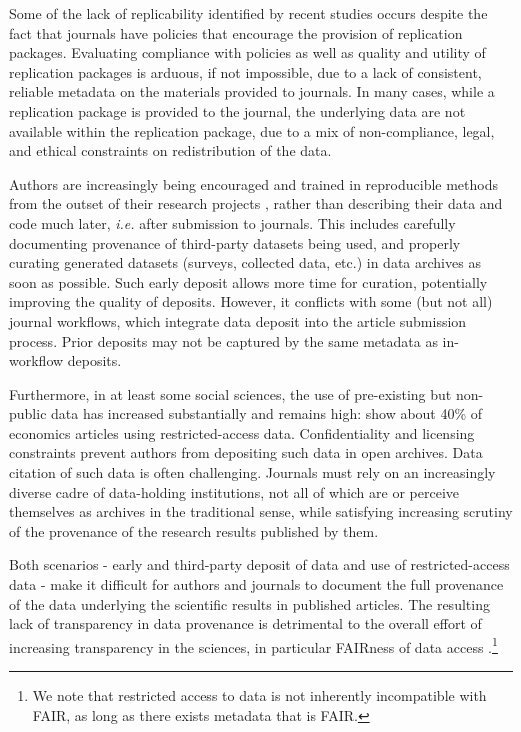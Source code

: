 Some of the lack of replicability identified by recent studies \parencite{Hoeffler2017a,Chang2017,ChangLi2015,CamererScience2016,StoddenPNAS2018}  occurs despite the fact that journals have  policies that encourage the provision of replication packages. Evaluating compliance with policies as well as quality and utility of replication packages is arduous, if not impossible, due to a lack of consistent, reliable metadata on the materials provided to journals. In many cases, while a replication package is provided to the journal, the underlying data are not available within the replication package, due to a mix of non-compliance, legal, and ethical constraints on redistribution of the data. 

Authors are increasingly being encouraged and trained in reproducible methods from the outset of their research projects \citep{WilsonArXiv160900037Cs2016,Christensen2019a}, rather than describing their data and code much later, \textit{i.e.} after submission to journals. This includes carefully documenting provenance of third-party datasets being used, and properly curating generated datasets (surveys, collected data, etc.) in data archives as soon as possible. Such early deposit allows more time for curation, potentially improving the quality of deposits. However, it conflicts with some (but not all) journal workflows, which integrate data deposit into the article submission process. Prior deposits may not be captured by the same metadata as in-workflow deposits.

Furthermore, in at least some social sciences, the use of pre-existing but non-public data has increased substantially \parencite{Chetty2012} and remains high: \cite{Kingi2018} show about 40\% of economics articles using restricted-access data.  Confidentiality and licensing constraints prevent authors from depositing such data in open archives. Data citation \parencite{DataCitationSynthesisGroup2014} of such data is often challenging. Journals must rely on an increasingly diverse cadre of data-holding institutions, not all of which are or perceive themselves as archives in the traditional sense, while satisfying increasing scrutiny of the provenance of the research results published by them. 

Both scenarios - early and third-party deposit of data and use of restricted-access data - make it difficult for authors and journals to document the full provenance of the data underlying the scientific results in published articles. The resulting lack of transparency in data provenance is detrimental to the overall effort of increasing transparency in the sciences, in particular FAIRness of data access \citep{HagstromFORCE112014}.\footnote{We note that restricted access to data is not inherently incompatible with FAIR, as long as there exists metadata that is FAIR.}

